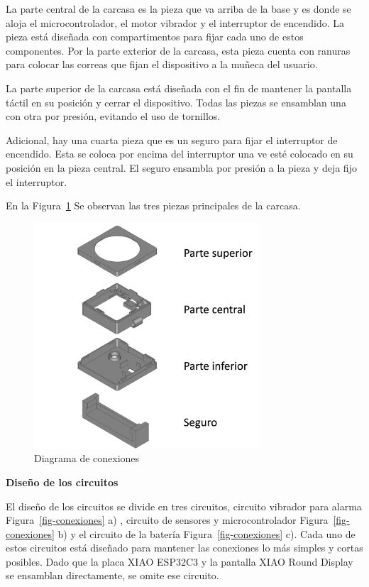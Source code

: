\documentclass[
  letterpaper,
  DIV=11,
  numbers=noendperiod]{scrreport}
\begin{document}
La parte central de la carcasa es la pieza que va arriba de la base y es
donde se aloja el microcontrolador, el motor vibrador y el interruptor
de encendido. La pieza está diseñada con compartimentos para fijar cada
uno de estos componentes. Por la parte exterior de la carcasa, esta
pieza cuenta con ranuras para colocar las correas que fijan el
dispositivo a la muñeca del usuario.

La parte superior de la carcasa está diseñada con el fin de mantener la
pantalla táctil en su posición y cerrar el dispositivo. Todas las piezas
se ensamblan una con otra por presión, evitando el uso de tornillos.

Adicional, hay una cuarta pieza que es un seguro para fijar el
interruptor de encendido. Esta se coloca por encima del interruptor una
ve esté colocado en su posición en la pieza central. El seguro ensambla
por presión a la pieza y deja fijo el interruptor.

En la Figura~\ref{fig-partescase} Se observan las tres piezas
principales de la carcasa.

\begin{figure}

{\centering \includegraphics[width=0.75\textwidth,height=\textheight]{Capitulos/../Imagenes/PartesCase.png}

}

\caption{\label{fig-partescase}Diagrama de conexiones}

\end{figure}

\textbf{Diseño de los circuitos}

El diseño de los circuitos se divide en tres circuitos, circuito
vibrador para alarma Figura~\ref{fig-conexiones} a) , circuito de
sensores y microcontrolador Figura~\ref{fig-conexiones} b) y el circuito
de la batería Figura~\ref{fig-conexiones} c). Cada uno de estos
circuitos está diseñado para mantener las conexiones lo más simples y
cortas posibles. Dado que la placa XIAO ESP32C3 y la pantalla XIAO Round
Display se ensamblan directamente, se omite ese circuito.
\end{document}
